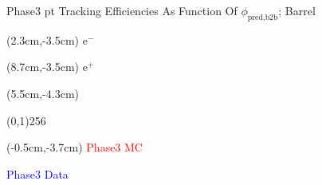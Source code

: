\documentclass[8pt]{beamer}
\begin{document}
\begin{frame}{Phase3 pt Tracking Efficiencies As Function Of $\phi_{\textrm{pred,b2b}}$; Barrel}
	
	\begin{textblock*}{2cm}(2.3cm,-3.5cm)
		$\textrm{e}^-$
	\end{textblock*}
	
	\begin{textblock*}{2cm}(8.7cm,-3.5cm)
		$\textrm{e}^+$
	\end{textblock*}
	
	
	
	\begin{textblock*}{11cm}(5.5cm,-4.3cm)
		
		\begin{center}
			\line(0,1){256}
		\end{center}
		
	\end{textblock*}
	
	
	
	\begin{textblock*}{4cm}(-0.5cm,-3.7cm)
		\textcolor{red}{Phase3 MC}
		
		\textcolor{blue}{Phase3 Data}
	\end{textblock*}
	
	
	
	
\end{frame}
\end{document}
